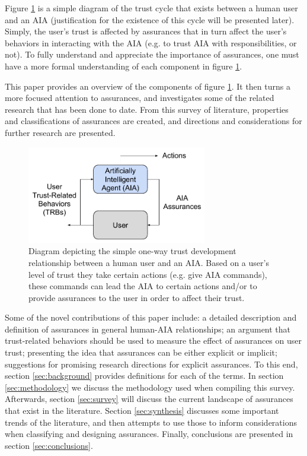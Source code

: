     Figure \ref{fig:SimpleTrust_one_way} is a simple diagram of the trust cycle that exists between a human user and an AIA (justification for the existence of this cycle will be presented later). Simply, the user's trust is affected by assurances that in turn affect the user's behaviors in interacting with the AIA (e.g. to trust AIA with responsibilities, or not). To fully understand and appreciate the importance of assurances, one must have a more formal understanding of each component in figure \ref{fig:SimpleTrust_one_way}.

    This paper provides an overview of the components of figure \ref{fig:SimpleTrust_one_way}. It then turns a more focused attention to assurances, and investigates some of the related research that has been done to date. From this survey of literature, properties and classifications of assurances are created, and directions and considerations for further research are presented.

    \begin{figure}
        \centering
        \includegraphics[width=0.7\textwidth]{Figures/SimpleTrust_one_way}
        \caption{Diagram depicting the simple one-way trust development relationship between a human user and an AIA. Based on a user's level of trust they take certain actions (e.g. give AIA commands), these commands can lead the AIA to certain actions and/or to provide assurances to the user in order to affect their trust.}
        \label{fig:SimpleTrust_one_way}
    \end{figure}

    Some of the novel contributions of this paper include: a detailed description and definition of assurances in general human-AIA relationships; an argument that trust-related behaviors should be used to measure the effect of assurances on user trust; presenting the idea that assurances can be either explicit or implicit; suggestions for promising research directions for explicit assurances. To this end, section \ref{sec:background} provides definitions for each of the terms. In section \ref{sec:methodology} we discuss the methodology used when compiling this survey. Afterwards, section \ref{sec:survey} will discuss the current landscape of assurances that exist in the literature. Section \ref{sec:synthesis} discusses some important trends of the literature, and then attempts to use those to inform considerations when classifying and designing assurances. Finally, conclusions are presented in section \ref{sec:conclusions}.
